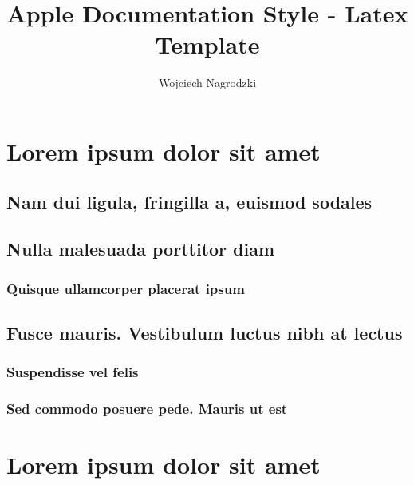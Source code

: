 \documentclass[10pt]{extarticle}
\begin{document}
\begin{titlepage} 
\title{Apple Documentation Style - Latex Template}
\author{Wojciech Nagrodzki}
\maketitle
\end{titlepage}

\section{Lorem ipsum dolor sit amet}
\lipsum[1]

\subsection{Nam dui ligula, fringilla a, euismod sodales}
\lipsum[2]

\subsection{Nulla malesuada porttitor diam}
\lipsum[3]
\subsubsection{Quisque ullamcorper placerat ipsum}
\lipsum[4]

\subsection{Fusce mauris. Vestibulum luctus nibh at lectus}
\lipsum[5]

\subsubsection{Suspendisse vel felis}
\lipsum[6]

\subsubsection{Sed commodo posuere pede. Mauris ut est}
\lipsum[7]

\section{Lorem ipsum dolor sit amet}
\end{document}
